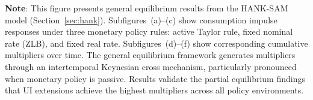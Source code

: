 \documentclass{econsocart}
\begin{document}
\noindent\parbox{\textwidth}{\footnotesize
  \textbf{Note}: This figure presents general equilibrium results from the HANK-SAM model (Section~\ref{sec:hank}).
  Subfigures~(a)--(c) show consumption impulse responses under three monetary policy rules:
  active Taylor rule, fixed nominal rate (ZLB), and fixed real rate.
  Subfigures~(d)--(f) show corresponding cumulative multipliers over time.
  The general equilibrium framework generates multipliers through an intertemporal Keynesian cross mechanism,
  particularly pronounced when monetary policy is passive.
  Results validate the partial equilibrium findings that UI extensions achieve the highest multipliers
  across all policy environments.
}

\vspace{1em}  %
\end{document}
